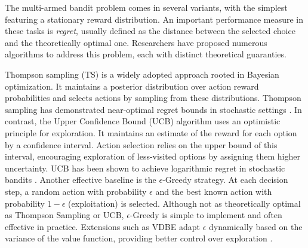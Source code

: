 
The multi-armed bandit problem comes in several variants, with the simplest featuring a stationary reward distribution.
An important performance measure in these tasks is \textit{regret}, usually defined as the distance between the selected choice and the theoretically optimal one.
Researchers have proposed numerous algorithms to address this problem, each with distinct theoretical guaranties.

Thompson sampling (TS) is a widely adopted approach rooted in Bayesian optimization. It maintains a posterior distribution over action reward probabilities and selects actions by sampling from these distributions. Thompson sampling has demonstrated near-optimal regret bounds in stochastic settings \cite{agrawalAnalysisThompsonSampling2012, kaufmannThompsonSamplingAsymptotically2012}.
In contrast, the Upper Confidence Bound (UCB) algorithm uses an optimistic principle for exploration. It maintains an estimate of the reward for each option by a confidence interval. Action selection relies on the upper bound of this interval, encouraging exploration of less-visited options by assigning them higher uncertainty. UCB has been shown to achieve logarithmic regret in stochastic bandits \cite{auerFinitetimeAnalysisMultiarmed2002}.
Another effective baseline is the $\epsilon$-Greedy strategy. At each decision step, a random action with probability $\epsilon$ and the best known action with probability $1 - \epsilon$ (exploitation) is selected.
Although not as theoretically optimal as Thompson Sampling or UCB, $\epsilon$-Greedy is simple to implement and often effective in practice.
Extensions such as VDBE adapt $\epsilon$ dynamically based on the variance of the value function, providing better control over exploration \cite{gittinsBanditProcessesDynamic1979, banMultifacetContextualBandits2021, tokicAdaptiveEGreedyExploration2010, tokicValueDifferenceBasedExploration2011}.

